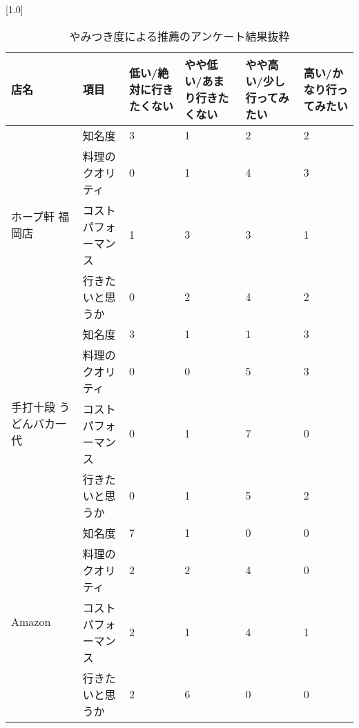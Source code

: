 \begin{table}[H]
\centering
\caption{やみつき度による推薦のアンケート結果抜粋}
\label{table:questionnaire:addictivity}
\small
\scalebox{0.7}[1.0]{
\begin{tabular}{|l|l|l|l|l|l|}
\hline
店名 & 項目 & 低い/絶対に行きたくない & やや低い/あまり行きたくない & やや高い/少し行ってみたい & 高い/かなり行ってみたい \\ \hline
\multirow{4}{*}{ホープ軒 福岡店} & 知名度 & 3 & 1 & 2 & 2 \\ \cline{2-6}
 & 料理のクオリティ & 0 & 1 & 4 & 3 \\ \cline{2-6}
 & コストパフォーマンス & 1 & 3 & 3 & 1 \\ \cline{2-6}
 & 行きたいと思うか & 0 & 2 & 4 & 2 \\ \hline
\multirow{4}{*}{手打十段 うどんバカ一代} & 知名度 & 3 & 1 & 1 & 3 \\ \cline{2-6}
 & 料理のクオリティ & 0 & 0 & 5 & 3 \\ \cline{2-6}
 & コストパフォーマンス & 0 & 1 & 7 & 0 \\ \cline{2-6}
 & 行きたいと思うか & 0 & 1 & 5 & 2 \\ \hline
\multirow{4}{*}{Amazon} & 知名度 & 7 & 1 & 0 & 0 \\ \cline{2-6}
 & 料理のクオリティ & 2 & 2 & 4 & 0 \\ \cline{2-6}
 & コストパフォーマンス & 2 & 1 & 4 & 1 \\ \cline{2-6}
 & 行きたいと思うか & 2 & 6 & 0 & 0 \\ \hline
\end{tabular}
}
\end{table}
